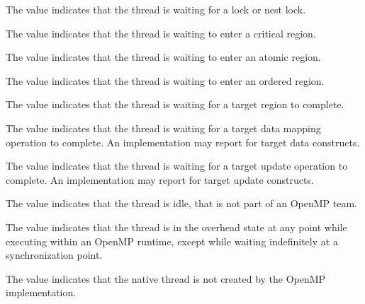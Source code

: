 The value  indicates that the thread is waiting 
for a  lock or nest lock. 

The value  indicates that the thread is 
waiting to enter a critical region. 

The value  indicates that the thread is 
waiting to enter an atomic region. 

The value  indicates that the thread is 
waiting to enter an ordered region. 


The value  indicates that the thread is 
waiting for a target region to complete.

The value  indicates that the thread 
is waiting for a target data mapping operation to complete. An implementation 
may report  for target data constructs.

The value  indicates that the thread 
is waiting for a target  update operation to complete. An implementation 
may report  for target update constructs.

The value  indicates that the thread is idle, that 
is not part of an OpenMP team.

The value  indicates that the thread is in the 
overhead state at any point while executing within an OpenMP runtime, 
except while waiting indefinitely at a synchronization point.

The value  indicates that the native thread is 
not created by the OpenMP implementation.

